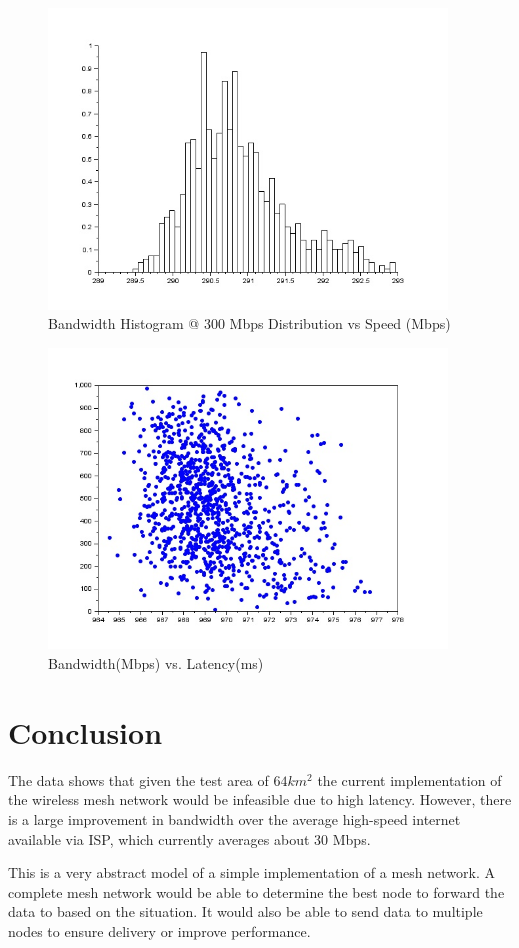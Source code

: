 \documentclass{amsart}
\begin{document}
\begin{figure}
\includegraphics[width=400px]{bandwidth_hist_300.jpg}
\caption{Bandwidth Histogram @ 300 Mbps Distribution vs Speed (Mbps)}
\end{figure}
\begin{figure}
\includegraphics[width=400px]{bandwidth_latency_plot.jpg}
\caption{Bandwidth(Mbps) vs. Latency(ms)}
\end{figure}
\section{Conclusion}
The data shows that given the test area of $64 km^2$ the current implementation of the wireless mesh network would be infeasible due to high latency. However, there is a large improvement in bandwidth over the average high-speed internet available via ISP, which currently averages about 30 Mbps.

This is a very abstract model of a simple implementation of a mesh network. A complete mesh network would be able to determine the best node to forward the data to based on the situation. It would also be able to send data to multiple nodes to ensure delivery or improve performance.
\end{document}
